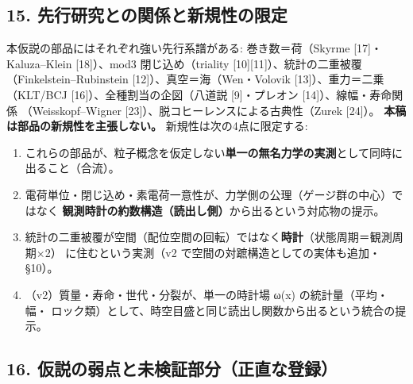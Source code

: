 \documentclass[
]{ltjarticle}
\providecommand{\tightlist}{%
  \setlength{\itemsep}{0pt}\setlength{\parskip}{0pt}}
\begin{document}
\subsection{15.
先行研究との関係と新規性の限定}\label{ux5148ux884cux7814ux7a76ux3068ux306eux95a2ux4fc2ux3068ux65b0ux898fux6027ux306eux9650ux5b9a}

本仮説の部品にはそれぞれ強い先行系譜がある: 巻き数＝荷（Skyrme
{[}17{]}・ Kaluza--Klein {[}18{]}）、mod3 閉じ込め（triality
{[}10{]}{[}11{]}）、統計の二重被覆 （Finkelstein--Rubinstein
{[}12{]}）、真空＝海（Wen・Volovik {[}13{]}）、重力＝二乗 （KLT/BCJ
{[}16{]}）、全種割当の企図（八道説 {[}9{]}・プレオン
{[}14{]}）、線幅・寿命関係 （Weisskopf--Wigner
{[}23{]}）、脱コヒーレンスによる古典性（Zurek {[}24{]}）。
\textbf{本稿は部品の新規性を主張しない。} 新規性は次の4点に限定する:

\begin{enumerate}
\def\labelenumi{\arabic{enumi}.}
\tightlist
\item
  これらの部品が、粒子概念を仮定しない\textbf{単一の無名力学の実測}として同時に
  出ること（合流）。
\item
  電荷単位・閉じ込め・素電荷一意性が、力学側の公理（ゲージ群の中心）ではなく
  \textbf{観測時計の約数構造（読出し側）}から出るという対応物の提示。
\item
  統計の二重被覆が空間（配位空間の回転）ではなく\textbf{時計}（状態周期＝観測周期×2）
  に住むという実測（v2 で空間の対蹠構造としての実体も追加・§10）。
\item
  （v2）質量・寿命・世代・分裂が、単一の時計場 ω(x) の統計量（平均・幅・
  ロック類）として、時空目盛と同じ読出し関数から出るという統合の提示。
\end{enumerate}

\subsection{16.
仮説の弱点と未検証部分（正直な登録）}\label{ux4eeeux8aacux306eux5f31ux70b9ux3068ux672aux691cux8a3cux90e8ux5206ux6b63ux76f4ux306aux767bux9332}
\end{document}
